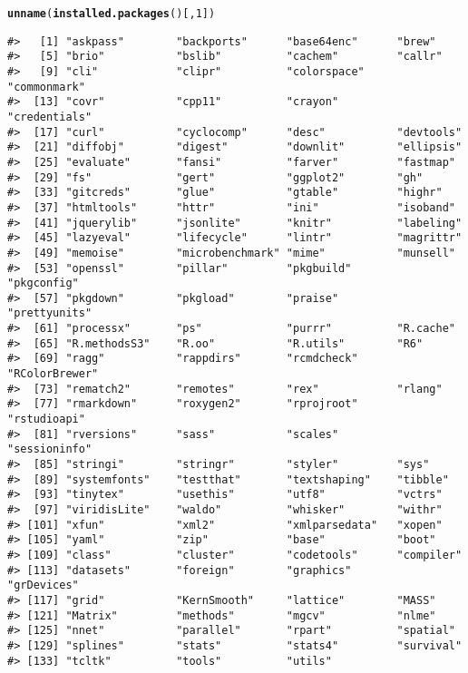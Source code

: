 \documentclass{article}\usepackage[]{graphicx}\usepackage{xcolor}
\makeatletter
\newcommand{\hlnum}[1]{\textcolor[rgb]{0.686,0.059,0.569}{#1}}%
\newcommand{\hlstd}[1]{\textcolor[rgb]{0.345,0.345,0.345}{#1}}%
\newcommand{\hlkwd}[1]{\textcolor[rgb]{0.737,0.353,0.396}{\textbf{#1}}}%
\newenvironment{kframe}{%
 \def\at@end@of@kframe{}%
 \ifinner\ifhmode%
  \def\at@end@of@kframe{\end{minipage}}%
  \begin{minipage}{\columnwidth}%
 \fi\fi%
 \def\FrameCommand##1{\hskip\@totalleftmargin \hskip-\fboxsep
 \colorbox{shadecolor}{##1}\hskip-\fboxsep
     \hskip-\linewidth \hskip-\@totalleftmargin \hskip\columnwidth}%
 \MakeFramed {\advance\hsize-\width
   \@totalleftmargin\z@ \linewidth\hsize
   \@setminipage}}%
 {\par\unskip\endMakeFramed%
 \at@end@of@kframe}
\newenvironment{knitrout}{}{} %
\makeatother
\begin{document}
\begin{knitrout}
\color{fgcolor}\begin{kframe}
\begin{alltt}
\hlkwd{unname}\hlstd{(}\hlkwd{installed.packages}\hlstd{()[,} \hlnum{1}\hlstd{])}
\end{alltt}
\begin{verbatim}
#>   [1] "askpass"        "backports"      "base64enc"      "brew"          
#>   [5] "brio"           "bslib"          "cachem"         "callr"         
#>   [9] "cli"            "clipr"          "colorspace"     "commonmark"    
#>  [13] "covr"           "cpp11"          "crayon"         "credentials"   
#>  [17] "curl"           "cyclocomp"      "desc"           "devtools"      
#>  [21] "diffobj"        "digest"         "downlit"        "ellipsis"      
#>  [25] "evaluate"       "fansi"          "farver"         "fastmap"       
#>  [29] "fs"             "gert"           "ggplot2"        "gh"            
#>  [33] "gitcreds"       "glue"           "gtable"         "highr"         
#>  [37] "htmltools"      "httr"           "ini"            "isoband"       
#>  [41] "jquerylib"      "jsonlite"       "knitr"          "labeling"      
#>  [45] "lazyeval"       "lifecycle"      "lintr"          "magrittr"      
#>  [49] "memoise"        "microbenchmark" "mime"           "munsell"       
#>  [53] "openssl"        "pillar"         "pkgbuild"       "pkgconfig"     
#>  [57] "pkgdown"        "pkgload"        "praise"         "prettyunits"   
#>  [61] "processx"       "ps"             "purrr"          "R.cache"       
#>  [65] "R.methodsS3"    "R.oo"           "R.utils"        "R6"            
#>  [69] "ragg"           "rappdirs"       "rcmdcheck"      "RColorBrewer"  
#>  [73] "rematch2"       "remotes"        "rex"            "rlang"         
#>  [77] "rmarkdown"      "roxygen2"       "rprojroot"      "rstudioapi"    
#>  [81] "rversions"      "sass"           "scales"         "sessioninfo"   
#>  [85] "stringi"        "stringr"        "styler"         "sys"           
#>  [89] "systemfonts"    "testthat"       "textshaping"    "tibble"        
#>  [93] "tinytex"        "usethis"        "utf8"           "vctrs"         
#>  [97] "viridisLite"    "waldo"          "whisker"        "withr"         
#> [101] "xfun"           "xml2"           "xmlparsedata"   "xopen"         
#> [105] "yaml"           "zip"            "base"           "boot"          
#> [109] "class"          "cluster"        "codetools"      "compiler"      
#> [113] "datasets"       "foreign"        "graphics"       "grDevices"     
#> [117] "grid"           "KernSmooth"     "lattice"        "MASS"          
#> [121] "Matrix"         "methods"        "mgcv"           "nlme"          
#> [125] "nnet"           "parallel"       "rpart"          "spatial"       
#> [129] "splines"        "stats"          "stats4"         "survival"      
#> [133] "tcltk"          "tools"          "utils"
\end{verbatim}
\end{kframe}
\end{knitrout}

\nocite{R-2021}

\printbibliography
\end{document}
